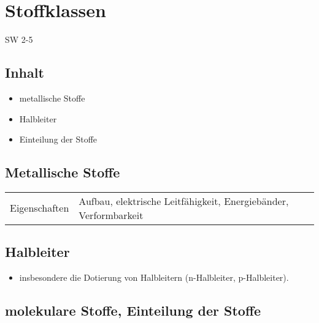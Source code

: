 \section{Stoffklassen}{SW 2-5 ~}

\subsection{Inhalt}
\begin{itemize}
\item metallische Stoffe
\item Halbleiter
\item Einteilung der Stoffe
\end{itemize}

\subsection{Metallische Stoffe}

\begin{tabular}{ll}
    Eigenschaften & Aufbau, elektrische Leitfähigkeit, Energiebänder, Verformbarkeit\\
\end{tabular}
        

\subsection{Halbleiter}
\begin{itemize}
\item insbesondere die Dotierung von Halbleitern (n-Halbleiter, p-Halbleiter). \\
\end{itemize}

\subsection{molekulare Stoffe, Einteilung der Stoffe}
